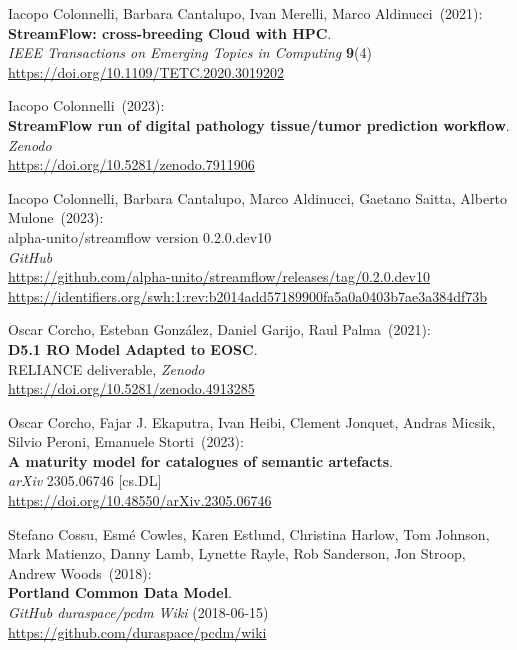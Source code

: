 \begin{thebibliography}{9}
Iacopo Colonnelli, Barbara Cantalupo, Ivan Merelli, Marco Aldinucci~(2021): \\
\textbf{StreamFlow: cross-breeding Cloud with HPC}.\\
\emph{IEEE Transactions on Emerging Topics in Computing} \textbf{9}(4)\\
\url{https://doi.org/10.1109/TETC.2020.3019202}

Iacopo Colonnelli~(2023): \\
\textbf{StreamFlow run of digital pathology tissue/tumor prediction workflow}.\\
\emph{Zenodo}\\
\url{https://doi.org/10.5281/zenodo.7911906}

 Iacopo Colonnelli, Barbara Cantalupo, Marco Aldinucci, Gaetano Saitta, Alberto Mulone~(2023): \\
alpha-unito/streamflow version 0.2.0.dev10\\
\emph{GitHub}\\
\url{https://github.com/alpha-unito/streamflow/releases/tag/0.2.0.dev10}\\
\url{https://identifiers.org/swh:1:rev:b2014add57189900fa5a0a0403b7ae3a384df73b}

Oscar Corcho, Esteban González, Daniel Garijo, Raul Palma~(2021): \\
\textbf{D5.1 RO Model Adapted to EOSC}.\\
RELIANCE deliverable, \emph{Zenodo}\\
\url{https://doi.org/10.5281/zenodo.4913285}

Oscar Corcho, Fajar J. Ekaputra, Ivan Heibi, Clement Jonquet, Andras
Micsik, Silvio Peroni, Emanuele Storti~(2023): \\
\textbf{A maturity model for catalogues of semantic artefacts}. \\
\emph{arXiv} 2305.06746 [cs.DL] \\
\url{https://doi.org/10.48550/arXiv.2305.06746}

Stefano Cossu, Esmé Cowles, Karen Estlund, Christina Harlow,
Tom Johnson, Mark Matienzo, Danny Lamb, Lynette Rayle, Rob Sanderson,
Jon Stroop, Andrew Woods~(2018): \\
\textbf{Portland Common Data Model}.\\
\emph{GitHub duraspace/pcdm Wiki} (2018-06-15)\\
\url{https://github.com/duraspace/pcdm/wiki}


\end{thebibliography}
